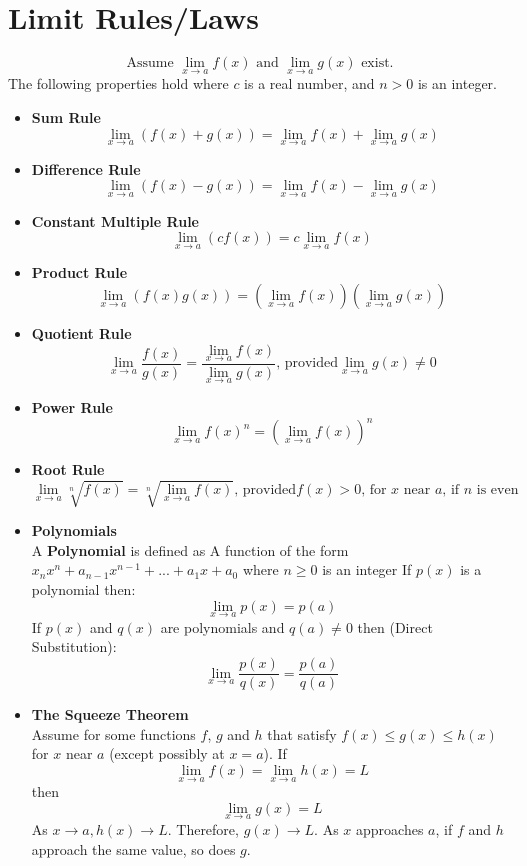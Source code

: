 \documentclass{article}
\begin{document}
\section*{Limit Rules/Laws}
$$\text{Assume }\lim_{x \to a}{f(x)}\text{ and }\lim_{x \to a}{g(x)}\text{ exist.}$$
The following properties hold where $c$ is a real number, and $n > 0$ is an integer.
\begin{itemize}
\item \textbf{Sum Rule}
  $$\lim_{x \to a}{(f(x) + g(x))} = \lim_{x \to a}{f(x)} + \lim_{x \to a}{g(x)}$$
\item \textbf{Difference Rule}
  $$\lim_{x \to a}{(f(x) - g(x))} = \lim_{x \to a}{f(x)} - \lim_{x \to a}{g(x)}$$
\item \textbf{Constant Multiple Rule}
  $$\lim_{x \to a}{(cf(x))} = c \lim_{x \to a}{f(x)}$$
\item \textbf{Product Rule}
  $$\lim_{x \to a}{(f(x)g(x))} = (\lim_{x \to a}{f(x)})(\lim_{x \to a}{g(x)})$$
\item \textbf{Quotient Rule}
  $$\lim_{x \to a}{\frac{f(x)}{g(x)}} = \frac{\lim\limits_{x \to a}{f(x)}}{\lim\limits_{x \to a}{g(x)}}\text{, provided}\lim_{x \to a}{g(x) \neq 0}$$
\item \textbf{Power Rule}
$$\lim_{x \to a}{f(x)^n} = (\lim_{x \to a}{f(x)})^n$$
\item \textbf{Root Rule}
$$\lim_{x \to a}{\sqrt[n]{f(x)}} = \sqrt[n]{\lim_{x \to a}{f(x)}}\text{, provided} f(x) > 0 \text{, for } x \text{ near } a \text{, if } n \text{ is even}$$
\item \textbf{Polynomials} \\
    A \textbf{Polynomial} is defined as A function of the form $x_n x^n + a_{n-1} x^{n-1} + ... + a_1x + a_0$ where $n \geq 0$ is an integer
    If $p(x)$ is a polynomial then:
    $$\lim_{x \to a}{p(x)} = p(a)$$
    If $p(x)$ and $q(x)$ are polynomials and $q(a) \neq 0$ then (Direct Substitution):
    $$\lim_{x \to a}{\frac{p(x)}{q(x)}} = \frac{p(a)}{q(a)}$$
\item \textbf{The Squeeze Theorem} \\
    Assume for some functions $f$, $g$ and $h$ that satisfy $f(x) \leq g(x) \leq h(x)$ for $x$ near $a$ (except possibly at $x = a$). If
    $$\lim_{x \to a}{f(x)} = \lim_{x \to a}{h(x)} = L$$
    then
    $$\lim_{x \to a}{g(x)} = L$$
    As $x \to a, h(x) \to L$. Therefore, $g(x) \to L$.
    As $x$ approaches $a$, if $f$ and $h$ approach the same value, so does $g$.
\end{itemize}
\end{document}
